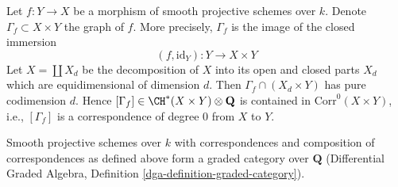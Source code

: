\begin{example}
\label{example-graph-correspondence}
Let $f : Y \to X$ be a morphism of smooth projective schemes over $k$.
Denote $\Gamma_f \subset X \times Y$ the graph of $f$. More precisely,
$\Gamma_f$ is the image of the closed immersion
$$
(f, \text{id}_Y) : Y \longrightarrow X \times Y
$$
Let $X = \coprod X_d$ be the decomposition of $X$ into its
open and closed parts $X_d$ which are equidimensional of dimension $d$.
Then $\Gamma_f \cap (X_d \times Y)$ has pure codimension $d$. Hence
$[\Gamma_f] \in \CH^*(X \times Y) \otimes \mathbf{Q}$
is contained in $\text{Corr}^0(X \times Y)$, i.e., $[\Gamma_f]$
is a correspondence of degree $0$ from $X$ to $Y$.
\end{example}

\begin{lemma}
\label{lemma-category-correspondences}
Smooth projective schemes over $k$ with correspondences and composition
of correspondences as defined above form a graded category over
$\mathbf{Q}$
(Differential Graded Algebra, Definition \ref{dga-definition-graded-category}).
\end{lemma}

